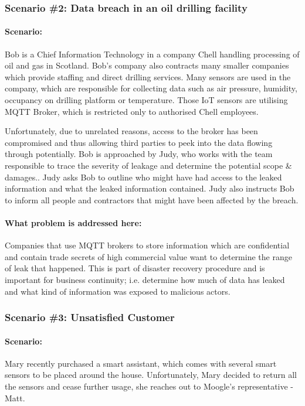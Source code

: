 \subsubsection{Scenario \#2: Data breach in an oil drilling facility}
\paragraph{\textbf{Scenario:}}
Bob is a Chief Information Technology in a company Chell handling processing of oil and gas in Scotland. Bob's company also contracts many smaller companies which provide staffing and direct drilling services. Many sensors are used in the company, which are responsible for collecting data such as air pressure, humidity, occupancy on drilling platform or temperature. Those IoT sensors are utilising MQTT Broker, which is restricted only to authorised Chell employees.

Unfortunately, due to unrelated reasons, access to the broker has been compromised and thus allowing third parties to peek into the data flowing through potentially. Bob is approached by Judy, who works with the team responsible to trace the severity of leakage and determine the potential scope \& damages.. Judy asks Bob to outline who might have had access to the leaked information and what the leaked information contained. Judy also instructs Bob to inform all people and contractors that might have been affected by the breach.
\paragraph{\textbf{What problem is addressed here:}}
Companies that use MQTT brokers to store information which are confidential and contain trade secrets of high commercial value want to determine the range of leak that happened. This is part of disaster recovery procedure and is important for business continuity; i.e. determine how much of data has leaked and what kind of information was exposed to malicious actors. 
\\
\subsubsection{Scenario \#3: Unsatisfied Customer}
\paragraph{\textbf{Scenario:}}
Mary recently purchased a smart assistant, which comes with several smart sensors to be placed around the house. Unfortunately, Mary decided to return all the sensors and cease further usage, she reaches out to Moogle's representative - Matt.

